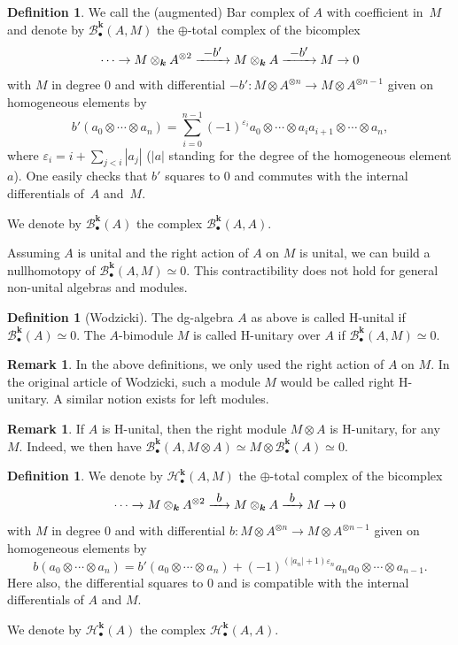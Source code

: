 \documentclass[JEP,XML,SOM,Unicode,NoEqCountersInSection]{cedram}
\let\mathcal\mathscr
\newcommand{\To}[1]{\mathchoice{\xrightarrow{\textstyle\kern4pt#1\kern3pt}}{\stackrel{#1}{\longrightarrow}}{}{}}
\newcommand{\sbullet}{{\scriptscriptstyle\bullet}}
\let\epsilon\varepsilon
\theoremstyle{definition}
\newtheorem{df}[thm]{Definition}
\newtheorem{rmq}[thm]{Remark}
\newcommand{\Bc}{\mathcal{B}}
\newcommand{\Hc}{\mathcal{H}}
\renewcommand{\k}{{\boldsymbol{k}}}
\begin{document}
\begin{df}
We call the (augmented) Bar complex of $A$ with coefficient in~$M$ and denote by $\Bc_\sbullet^\k(A,M)$ the $\oplus$-total complex of the bicomplex
\[
\cdots \to M \otimes_\k A^{\otimes 2} \To{-b'} M \otimes_\k A \To{-b'} M \to 0
\]
with $M$ in degree $0$ and with differential $-b' \colon M \otimes A^{\otimes n} \to M \otimes A^{\otimes n-1}$ given on homogeneous elements by
\[
b'(a_0 \otimes \cdots \otimes a_n) = \sum_{i = 0}^{n-1} (-1)^{\epsilon_i} a_0 \otimes \cdots \otimes a_i a_{i+1} \otimes \cdots \otimes a_n,
\]
where $\epsilon_i = i + \sum_{j<i}|a_j|$ ($|a|$ standing for the degree of the homogeneous element $a$). One easily checks that $b'$ squares to $0$ and commutes with the internal differentials of~$A$ and~$M$.

We denote by $\Bc_\sbullet^\k(A)$ the complex $\Bc_\sbullet^\k(A,A)$.
\end{df}

Assuming $A$ is unital and the right action of $A$ on $M$ is unital, we can build a nullhomotopy of $\Bc_\sbullet^\k(A,M) \simeq 0$.
This contractibility does not hold for general non-unital algebras and modules.
\begin{df}[Wodzicki]
The dg-algebra $A$ as above is called H-unital if $\Bc_\sbullet^\k(A) \simeq 0$.
The $A$-bimodule $M$ is called H-unitary over $A$ if $\Bc_\sbullet^\k(A,M) \simeq 0$.
\end{df}

\begin{rmq}
In the above definitions, we only used the right action of $A$ on $M$. In the original article of Wodzicki, such a module $M$ would be called right H-unitary. A similar notion exists for left modules.
\end{rmq}

\begin{rmq}\label{rmq:MtimesAHunital}
If $A$ is H-unital, then the right module $M \otimes A$ is H-unitary, for any~$M$. Indeed, we then have $\Bc_\sbullet^\k(A,M \otimes A) \simeq M \otimes \Bc_\sbullet^\k(A) \simeq 0$.
\end{rmq}

\begin{df}
We denote by $\Hc_\sbullet^\k(A,M)$ the $\oplus$-total complex of the bicomplex
\[
\cdots \to M \otimes_\k A^{\otimes 2} \To{b} M \otimes_\k A \To{b} M \to 0
\]
with $M$ in degree $0$ and with differential $
b \colon M \otimes A^{\otimes n} \to M \otimes A^{\otimes n-1}$ given on homogeneous elements by
\[
b(a_0 \otimes \cdots \otimes a_n) = b'(a_0 \otimes \cdots \otimes a_n) + (-1)^{(|a_n|+1)\epsilon_n} a_na_0 \otimes \cdots \otimes a_{n-1}.
\]
Here also, the differential squares to $0$ and is compatible with the internal differentials of $A$ and $M$.

We denote by $\Hc_\sbullet^\k(A)$ the complex $\Hc_\sbullet^\k(A,A)$.
\end{df}
\end{document}
